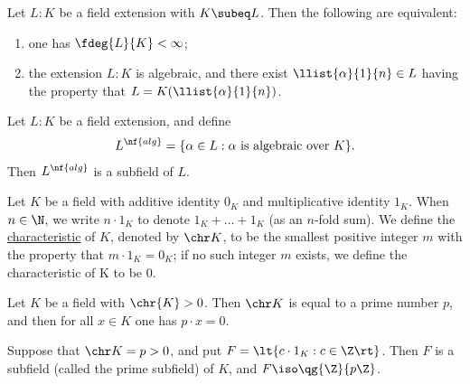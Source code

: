 \documentclass{article}
\begin{document}
  \begin{ttheorem}
    Let \( L:K \) be a field extension with \( K\subeq L \).
    Then the following are equivalent:
    \begin{enumerate}[label=(\roman*)]
      \item one has \( \fdeg{L}{K}<\infty \);
      \item the extension \( L:K \) is algebraic, and there exist \( \llist{\alpha}{1}{n}\in L \) having the property that \( L=K(\llist{\alpha}{1}{n}) \).
    \end{enumerate}
  \end{ttheorem}

  \begin{tproposition}
    Let \( L:K \) be a field extension, and define \begin{align*}
      L^{\nf{alg}}=\{\alpha\in L : \alpha \text{ is algebraic over } K\}.
    \end{align*}
    Then \( L^{\nf{alg}} \) is a subfield of \( L \).
  \end{tproposition}

  \begin{tdefinition}[Characteristic]
    Let \( K \) be a field with additive identity \( 0_K \) and multiplicative identity \( 1_K \).
    When \( n\in \N \), we write \( n\cdot 1_K \) to denote \( 1_K+\ldots+ 1_K \) (as an \( n \)-fold sum).
    We define the \ul{characteristic} of \( K \), denoted by \( \chr K \), to be the smallest positive integer \( m \) with the property that \( m\cdot 1_K = 0_K \);
    if no such integer \( m \) exists, we define the characteristic of K to be 0.
  \end{tdefinition}

  \begin{tproposition}
    Let \( K \) be a field with \( \chr{K} > 0 \).
    Then \( \chr K \) is equal to a prime number \( p \), and then for all \( x\in K \) one has \( p\cdot x=0 \).
  \end{tproposition}

  \begin{ttheorem}
    Suppose that \( \chr K = p > 0 \), and put \( F=\lt\{ c\cdot 1_K : c\in \Z \rt\} \).
    Then \( F \) is a subfield (called the prime subfield) of \( K \), and \( F\iso \qg{\Z}{p\Z} \).
  \end{ttheorem}
\end{document}
